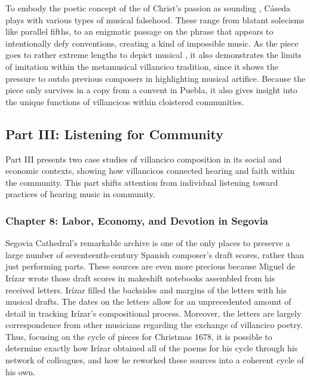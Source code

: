 \documentclass{vcbook-proposal}
\begin{document}
To embody the poetic concept of the  of Christ's passion as sounding , Cáseda plays with various types of musical falsehood.
These range from blatant solecisms like parallel fifths, to an enigmatic passage on the phrase  that appears to intentionally defy  conventions, creating a kind of impossible music.
As the piece goes to rather extreme lengths to depict musical , it also demonstrates the limits of imitation within the metamusical villancico tradition, since it shows the pressure to outdo previous composers in highlighting musical artifice.
Because the piece only survives in a copy from a convent in Puebla, it also gives insight into the unique functions of villancicos within cloistered communities.

\subsection{Part III: Listening for Community}

Part III presents two case studies of villancico composition in its social and economic contexts, showing how villancicos connected hearing and faith within the community.
This part shifts attention from individual listening toward practices of hearing music in community.

\subsubsection{Chapter 8: Labor, Economy, and Devotion in Segovia}

Segovia Cathedral's remarkable archive is one of the only places to preserve a large number of seventeenth-century Spanish composer's draft scores, rather than just performing parts.
These sources are even more precious because Miguel de Irízar wrote those draft scores in makeshift notebooks assembled from his received letters.
Irízar filled the backsides and margins of the letters with his musical drafts.
The dates on the letters allow for an unprecedented amount of detail in tracking Irízar's compositional process.
Moreover, the letters are largely correspondence from other musicians regarding the exchange of villancico poetry.
Thus, focusing on the cycle of pieces for Christmas 1678, it is possible to determine exactly how Irízar obtained all of the poems for his cycle through his network of colleagues, and how he reworked these sources into a coherent cycle of his own.
\end{document}
